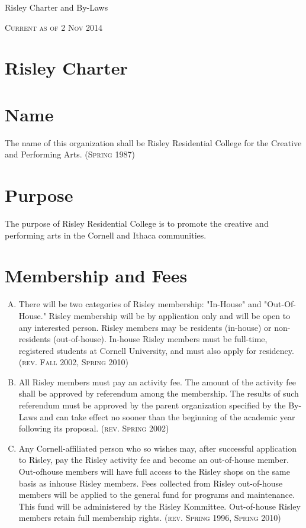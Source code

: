 \documentclass[12pt]{article}
\begin{document}
\centerline{\huge{Risley Charter and By-Laws}}
\centerline{\textsc{Current as of 2 Nov 2014}}
\hrulefill
\section*{Risley Charter}
\section{Name}
\label{sec:name}
The name of this organization shall be Risley Residential College for the Creative and Performing Arts. \textsc{\footnotesize{(Spring 1987)}}
\section{Purpose}
The purpose of Risley Residential College is to promote the creative and performing arts in the Cornell and Ithaca communities.
\section{Membership and Fees}
\begin{enumerate}[A.]
\item There will be two categories of Risley membership: "In-House" and "Out-Of-House." Risley membership will be by application only and will be open to any interested person. Risley members may be residents (in-house) or non-residents (out-of-house). In-house Risley members must be full-time, registered students at Cornell University, and must also apply for residency. \textsc{\footnotesize{(rev. Fall 2002, Spring 2010)}}
\item All Risley members must pay an activity fee. The amount of the activity fee shall be approved by referendum among the membership. The results of such referendum must be approved by the parent organization specified by the By- Laws and can take effect no sooner than the beginning of the academic year following its proposal. \textsc{\footnotesize{(rev. Spring 2002)}}
\item Any Cornell-affiliated person who so wishes may, after successful application to Risley, pay the Risley activity fee and become an out-of-house member. Out-ofhouse members will have full access to the Risley shops on the same basis as inhouse Risley members. Fees collected from Risley out-of-house members will be applied to the general fund for programs and maintenance. This fund will be administered by the Risley Kommittee. Out-of-house Risley members retain full membership rights. \textsc{\footnotesize{(rev. Spring 1996, Spring 2010)}}
\end{enumerate}
\end{document}
